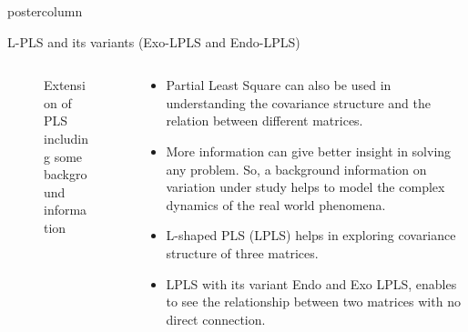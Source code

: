 \documentclass[9pt, final]{beamer}\usepackage[]{graphicx}\usepackage[]{color}
\begin{document}
\begin{frame}[fragile]
\begin{columns}
\begin{column}{.49\textwidth}
\begin{beamercolorbox}[center,wd=\textwidth]{postercolumn}
\begin{minipage}[T]{.98\textwidth}
{\begin{block}{L-PLS and its variants (Exo-LPLS and Endo-LPLS)}
\begin{columns}[b]
\begin{column}{0.35\textwidth}
\begin{figure}
            				\caption{Extension of PLS including some background information}
            				\label{fig:lpls}
            			\end{figure}
            		\end{column}
            		\begin{column}{0.63\textwidth}
            			\begin{itemize}
            				\item Partial Least Square can also be used in understanding the covariance structure and the relation between different matrices. 
            				\item More information can give better insight in solving any problem. So, a background information on variation under study helps to model the complex dynamics of the real world phenomena.
            				\item L-shaped PLS (LPLS) helps in exploring covariance structure of three matrices.
            				\item LPLS with its variant Endo and Exo LPLS, enables to see the relationship between two matrices with no direct connection.
            			\end{itemize}
            		\end{column}
            	\end{columns}            
            	

\end{block}}
\end{minipage}
\end{beamercolorbox}
\end{column}
\end{columns}
\end{frame}
\end{document}
